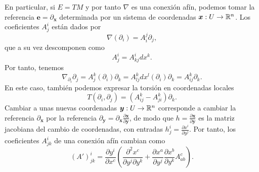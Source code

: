 \documentclass[11pt,a4paper]{amsbook}
\theoremstyle{remark} \newtheorem{rmk}[subsection]{Observación}
\theoremstyle{definition} \newtheorem{defn}[subsection]{Definición}
\theoremstyle{definition} \newtheorem{ex}[subsection]{Ejemplo}
\theoremstyle{definition} \newtheorem{ej}[subsection]{Ejercicio}
\begin{document}
En particular, si $E=TM$ y por tanto $\nabla$ es una conexión afín, podemos tomar la referencia $\bm{e}=\partial_{\bm{x}}$ determinada por un sistema de coordenadas $\bm{x}:U\rightarrow \mathbb R^n$. Los coeficientes $A^i_j$ están dados por
\begin{equation*}
\nabla(\partial_i) = A^j_i \partial_j,
\end{equation*}
que a su vez descomponen como
\begin{equation*}
A^i_j=A^i_{kj} dx^k.
\end{equation*}
Por tanto, tenemos
\begin{equation*}
\nabla_{\partial_i} \partial_j = A^k_j(\partial_i) \partial_k = A^k_{lj} dx^l(\partial_i) \partial_k = A^k_{ij} \partial_k.
\end{equation*}
En este caso, también podemos expresar la torsión en coordenadas locales
\begin{equation*}
T(\partial_i,\partial_j) = (A_{ij}^k - A_{ji}^k) \partial_k.
\end{equation*}
Cambiar a unas nuevas coordenadas $\bm{y}:U\rightarrow \mathbb R^n$ corresponde a cambiar la referencia $\partial_{\bm{x}}$ por la referencia $\partial_{\bm{y}}=\partial_{\bm{x}}\frac{\partial \bm{x}}{\partial \bm{y}}$, de modo que $h=\frac{\partial \bm{x}}{\partial \bm{y}}$ es la matriz jacobiana del cambio de coordenadas, con entradas $h^i_j = \frac{\partial x^i}{\partial y^j}$. Por tanto, los coeficientes $A^i_{jk}$ de una conexión afín cambian como
\begin{equation*}
(A')^i_{jk} = \frac{\partial y^i}{\partial x^c} \left( \frac{\partial^2 x^c}{\partial y^j \partial y^k} + \frac{\partial x^a}{\partial y^j} \frac{\partial x^b}{\partial y^k} A_{ab}^c \right).
\end{equation*}
\end{document}
